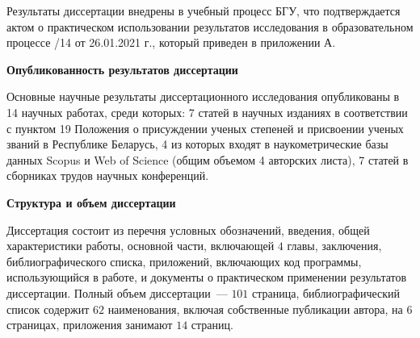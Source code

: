 \documentclass[_00_dissertation.tex]{subfiles}
\begin{document}
Результаты диссертации внедрены в учебный процесс БГУ, что подтверждается актом о практическом использовании результатов исследования в образовательном процессе /14 от 26.01.2021 г., который приведен в приложении А.

\begin{center}
\textbf{Опубликованность результатов диссертации}
\end{center}

Основные научные результаты диссертационного исследования опубликованы в 14 научных работах, среди которых: 7 статей в научных изданиях в соответствии с пунктом 19 Положения о присуждении ученых степеней и присвоении ученых званий в Республике Беларусь, 4 из которых входят в наукометрические базы данных Scopus и Web of Science (общим объемом 4 авторских листа), 7 статей в сборниках трудов научных конференций.

\begin{center}
\textbf{Структура и объем диссертации}
\end{center}

Диссертация состоит из перечня условных обозначений, введения, общей характеристики работы, основной части, включающей $4$ главы, заключения, библиографического списка, приложений, включающих код программы, использующийся в работе, и документы о практическом применении результатов диссертации.
Полный объем диссертации~--- $101$ страница, библиографический список содержит $62$ наименования, включая собственные публикации автора, на $6$ страницах, приложения занимают $14$ страниц.

\onlyinsubfile{
    
}
\end{document}
